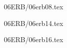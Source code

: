 \documentclass[9pt, xcolor={svgnames, x11names},professionalfonts]{beamer}
\def\scale{1}
\begin{document}
\begin{frame}{06ERB/06erb08.tex}	
		\def\scale{0.75}
		\tcb{
			
		}		
\end{frame}


\begin{frame}{06ERB/06erb14.tex}	
	\def\scale{0.55}
	\tcb{
		\centering
		
	}			
\end{frame}


\begin{frame}{06ERB/06erb16.tex}	
	\def\scale{1}
	\tcb{
		\centering
		
	}
\end{frame}



% 		
		






\end{document}
